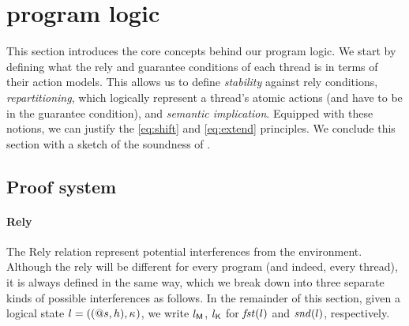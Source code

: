 \section{\colosl program logic}

This section introduces the core concepts behind our program logic. We
start by defining what the rely and guarantee conditions of each
thread is in terms of their action models. This allows us to define
\emph{stability} against rely conditions, \emph{repartitioning},
which logically represent a thread's atomic actions (and have to be in
the guarantee condition), and \emph{semantic implication}. Equipped
with these notions, we can justify the \eqref{eq:shift} and
\eqref{eq:extend} principles. We conclude this section with a sketch
of the soundness of \colosl.

\subsection{Proof system}

\paragraph{Rely}
The Rely relation represent potential interferences from the
environment. Although the rely will be different for every program
(and indeed, every thread), it is always defined in the same way,
which we break down into three separate kinds of possible
interferences as follows. In the remainder of this section, given a
logical state $l = ((@s,h),\kappa_{})$, we write $l_{\textsf{M}}$, $l_{\textsf{K}}$ for
$\mathit{fst}(l)$ and $\mathit{snd}(l)$, respectively.

